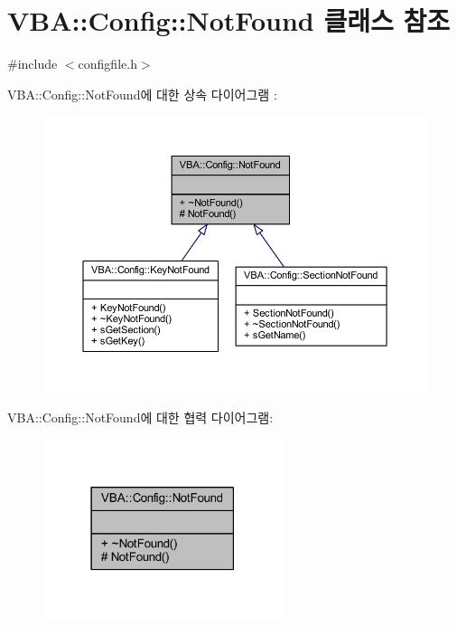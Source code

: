 \hypertarget{class_v_b_a_1_1_config_1_1_not_found}{}\section{V\+BA\+:\+:Config\+:\+:Not\+Found 클래스 참조}
\label{class_v_b_a_1_1_config_1_1_not_found}


{\ttfamily \#include $<$configfile.\+h$>$}



V\+BA\+:\+:Config\+:\+:Not\+Found에 대한 상속 다이어그램 \+: \nopagebreak
\begin{figure}[H]
\begin{center}
\leavevmode
\includegraphics[width=350pt]{class_v_b_a_1_1_config_1_1_not_found__inherit__graph}
\end{center}
\end{figure}


V\+BA\+:\+:Config\+:\+:Not\+Found에 대한 협력 다이어그램\+:\nopagebreak
\begin{figure}[H]
\begin{center}
\leavevmode
\includegraphics[width=198pt]{class_v_b_a_1_1_config_1_1_not_found__coll__graph}
\end{center}
\end{figure}
